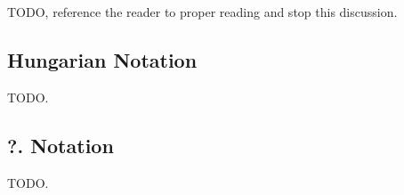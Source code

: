 \begin{englishtext}
    TODO, reference the reader to proper reading and stop this discussion.


    \subsection{Hungarian Notation}

    TODO.


    \subsection{?. Notation}

    TODO.

\end{englishtext}


\lang{}{}



